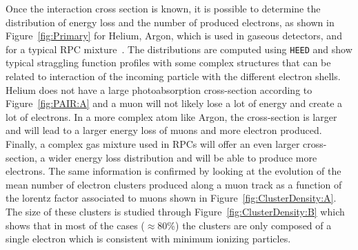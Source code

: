 	Once the interaction cross section is known, it is possible to determine the distribution of energy loss and the number of produced electrons, as shown in Figure~\ref{fig:Primary} for Helium, Argon, which is used in gaseous detectors, and for a typical RPC mixture~\cite{VINCENT2017}. The distributions are computed using \texttt{HEED} and show typical straggling function profiles with some complex structures that can be related to interaction of the incoming particle with the different electron shells. Helium does not have a large photoabsorption cross-section according to Figure~\ref{fig:PAIR:A} and a muon will not likely lose a lot of energy and create a lot of electrons. In a more complex atom like Argon, the cross-section is larger and will lead to a larger energy loss of muons and more electron produced. Finally, a complex gas mixture used in RPCs will offer an even larger cross-section, a wider energy loss distribution and will be able to produce more electrons. The same information is confirmed by looking at the evolution of the mean number of electron clusters produced along a muon track as a function of the lorentz factor associated to muons shown in Figure~\ref{fig:ClusterDensity:A}. The size of these clusters is studied through Figure~\ref{fig:ClusterDensity:B} which shows that in most of the cases ($\approx$80\%) the clusters are only composed of a single electron which is consistent with minimum ionizing particles.
	
